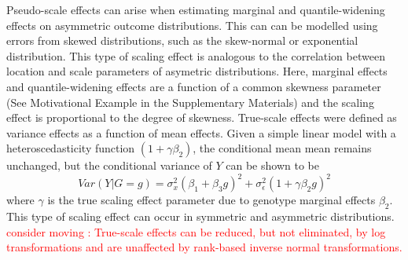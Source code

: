 \documentclass[12pt]{article}
\begin{document}
\begin{appendices}
Pseudo-scale effects can arise when estimating marginal and quantile-widening effects on asymmetric outcome distributions. This can can be modelled using errors from skewed distributions, such as the skew-normal or exponential distribution. This type of scaling effect is analogous to the correlation between location and scale parameters of asymetric distributions. Here, marginal effects and quantile-widening effects are a function of a common skewness parameter (See Motivational Example in the Supplementary Materials) and the scaling effect is proportional to the degree of skewness. True-scale effects were defined as variance effects as a function of mean effects. Given a simple linear model with a heteroscedasticity function $(1+\gamma\beta_2)$, the conditional mean mean remains unchanged, but the conditional variance of $Y$ can be shown to be
\begin{equation} \label{TrueScaleMod}
Var(Y|G=g)=\sigma_x^2 (\beta_1+\beta_3 g)^2 + \sigma_\epsilon^2 (1+\gamma\beta_2 g)^2
\end{equation}
where $\gamma$ is the true scaling effect parameter due to genotype marginal effects $\beta_2$. This type of scaling effect can occur in symmetric and asymmetric distributions. \textcolor{red}{consider moving : True-scale effects can be reduced, but not eliminated, by log transformations and are unaffected by rank-based inverse normal transformations.} 


\end{appendices}
\end{document}
